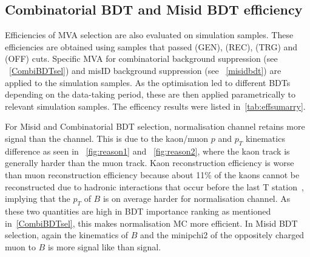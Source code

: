 \subsection{Combinatorial BDT and Misid BDT efficiency}
 Efficiencies of MVA selection are also evaluated on simulation samples. These efficiencies are obtained using samples that passed (GEN), (REC), (TRG) and (OFF) cuts. Specific MVA for combinatorial background suppression (see ~\autoref{CombiBDTsel}) and misID background suppression (see ~\autoref{misidbdt}) are applied to the simulation samples. As the optimisation led to different BDTs depending on the data-taking period, these are then applied parametrically to relevant simulation samples. The efficency results were listed in~\autoref{tab:effsumarry}.

For Misid and Combinatorial BDT selection, normalisation \bjpsimumuk channel retains more signal than the \Bmumumu channel. This is due to the kaon/muon $p$ and $p_{T}$ kinematics difference as seen in ~\autoref{fig:reason1} and ~\autoref{fig:reason2}, where the kaon track is generally harder than the muon track. Kaon reconstruction efficiency is worse than muon reconstruction efficiency because about 11\% of the kaons cannot be reconstructed due to hadronic interactions that occur before the last T station~\cite{LHCb-DP-2013-002}, implying that the $p_{T}$ of $B$ is on average harder for normalisation channel. As these two quantities are high in BDT importance ranking as mentioned in~\autoref{CombiBDTsel}, this makes normalisation MC more efficient. In Misid BDT selection, again the kinematics of $B$ and the \gls{minipchi2} of the oppositely charged muon to $B$ is more signal like than signal.



